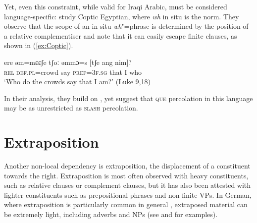 \documentclass[output=paper
	        ,collection
	        ,collectionchapter
 	        ,biblatex
                ,babelshorthands
                ,newtxmath
                ,draftmode
                ,colorlinks, citecolor=brown
]{langscibook}
\begin{document}
{    
 \begin{exe}
  \ex \label{ex:IraqiLoc}
  \begin{xlist}
    
  \end{xlist}

\end{exe}


Yet, even this constraint, while valid for Iraqi Arabic, must be
considered language-specific: \citet{Crysmann:Reintges:14} study
Coptic Egyptian, where \emph{wh} in situ is the norm. They observe that the
scope of an in situ \emph{wh}"=phrase is determined by the position of
a relative complementiser and note that it can easily escape finite
clauses, as shown in (\ref{ex:Coptic}).

\begin{exe}
  \ex \gll ere əm=mɛɛʃe tʃoː əmmɔ=s [tʃe ang nim]?\\
  \textsc{rel} \textsc{def.pl}=crowd say \textsc{prep=3f.sg} \spacebr{}that I who\\
  \glt `Who do the crowds say that I am?'  (Luke 9,18) \label{ex:Coptic}
\end{exe}

\noindent
In their analysis, they build on \citet{Johnson:Lappin:97}, yet suggest that \textsc{que} percolation in this language may be as unrestricted as \textsc{slash} percolation.


\section{Extraposition}

Another non-local dependency is extraposition, the displacement of a
constituent towards the right. Extraposition is most often observed
with heavy constituents, such as relative clauses or complement
clauses, but it has also been attested with lighter constituents such
as prepositional phrases and non-finite VPs. In German, where
extraposition is particularly common in general
\citep{uszkoreit:etal:98}, extraposed material can be extremely light,
including adverbs and NPs (see \citealt[Section~13.1]{Mueller99a} and
\citealt[\page ix--xi]{Mueller2002b} for examples).



}
\end{document}
